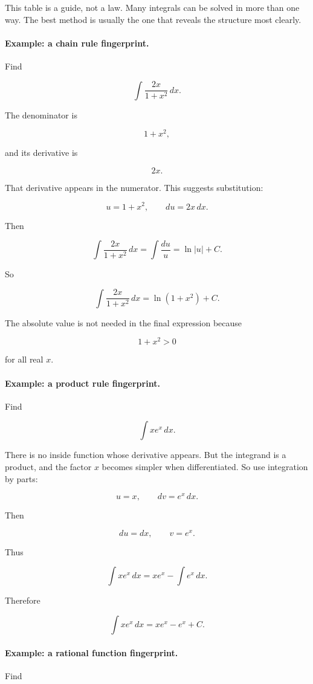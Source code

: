 This table is a guide, not a law.  Many integrals can be solved in more than one way.
The best method is usually the one that reveals the structure most clearly.

\paragraph{Example: a chain rule fingerprint.}
Find

\[
\int \frac{2x}{1+x^2}\,dx.
\]

The denominator is

\[
1+x^2,
\]

and its derivative is

\[
2x.
\]

That derivative appears in the numerator.  This suggests substitution:

\[
u=1+x^2,
\qquad
du=2x\,dx.
\]

Then

\[
\int \frac{2x}{1+x^2}\,dx
=
\int \frac{du}{u}
=
\ln|u|+C.
\]

So

\[
\boxed{
\int \frac{2x}{1+x^2}\,dx
=
\ln(1+x^2)+C.
}
\]

The absolute value is not needed in the final expression because

\[
1+x^2>0
\]

for all real \(x\).

\paragraph{Example: a product rule fingerprint.}
Find

\[
\int x e^x\,dx.
\]

There is no inside function whose derivative appears.  But the integrand is a product,
and the factor \(x\) becomes simpler when differentiated.  So use integration by parts:

\[
u=x,
\qquad
dv=e^x\,dx.
\]

Then

\[
du=dx,
\qquad
v=e^x.
\]

Thus

\[
\int x e^x\,dx
=
xe^x-\int e^x\,dx.
\]

Therefore

\[
\boxed{
\int x e^x\,dx=xe^x-e^x+C.
}
\]

\paragraph{Example: a rational function fingerprint.}
Find

